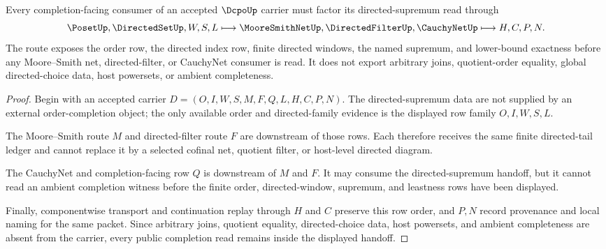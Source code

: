 \begin{theorem}
\label{thm:dcpo-directed-supremum-handoff}
Every completion-facing consumer of an accepted $\DcpoUp$ carrier must factor its directed-supremum read through
$$
\PosetUp,\DirectedSetUp,W,S,L \longmapsto \MooreSmithNetUp,\DirectedFilterUp,\CauchyNetUp \longmapsto H,C,P,N .
$$
The route exposes the order row, the directed index row, finite directed windows, the named supremum, and lower-bound exactness before any Moore--Smith net, directed-filter, or CauchyNet consumer is read. It does not export arbitrary joins, quotient-order equality, global directed-choice data, host powersets, or ambient completeness.
\end{theorem}
\begin{proof}
Begin with an accepted carrier $D=(O,I,W,S,M,F,Q,L,H,C,P,N)$. The directed-supremum data are not supplied by an external order-completion object; the only available order and directed-family evidence is the displayed row family $O,I,W,S,L$.

The Moore--Smith route $M$ and directed-filter route $F$ are downstream of those rows. Each therefore receives the same finite directed-tail ledger and cannot replace it by a selected cofinal net, quotient filter, or host-level directed diagram.

The CauchyNet and completion-facing row $Q$ is downstream of $M$ and $F$. It may consume the directed-supremum handoff, but it cannot read an ambient completion witness before the finite order, directed-window, supremum, and leastness rows have been displayed.

Finally, componentwise transport and continuation replay through $H$ and $C$ preserve this row order, and $P,N$ record provenance and local naming for the same packet. Since arbitrary joins, quotient equality, directed-choice data, host powersets, and ambient completeness are absent from the carrier, every public completion read remains inside the displayed handoff.
\end{proof}

